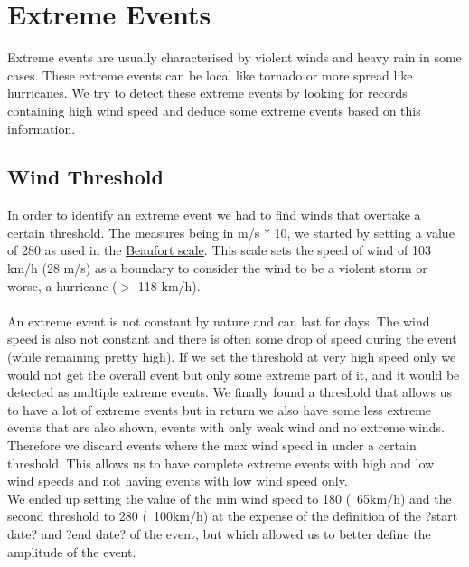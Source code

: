 \section{Extreme Events}
\noindent
Extreme events are usually characterised by violent winds and heavy rain in some cases. These extreme events can be local like tornado or more spread like hurricanes. We try to detect these extreme events by looking for records containing high wind speed and deduce some extreme events based on this information.

\subsection{Wind Threshold}
In order to identify an extreme event we had to find winds that overtake a certain threshold. The measures being in m/s * 10, we started by setting a value of 280 as used in the \href{http://en.wikipedia.org/wiki/Beaufort_scale}{Beaufort scale}. This scale sets the speed of wind of 103 km/h (28 m/s) as a boundary to consider the wind to be a violent storm or worse, a hurricane ($>$ 118 km/h).\\
\\
An extreme event is not constant by nature and can last for days. The wind speed is also not constant and there is often some drop of speed during the event (while remaining pretty high). If we set the threshold at very high speed only we would not get the overall event but only some extreme part of it, and it would be detected as multiple extreme events. We finally found a threshold that allows us to have a lot of extreme events but in return we also have some less extreme events that are also shown, events with only weak wind and no extreme winds. Therefore we discard events where the max wind speed in under a certain threshold. This allows us to have complete extreme events with high and low wind speeds and not having events with low wind speed only.\\
We ended up setting the value of the min wind speed to 180 (~65km/h) and the second threshold to 280 (~100km/h) at the expense of the definition of the ?start date? and ?end date? of the event, but which allowed us to better define the amplitude of the event.

